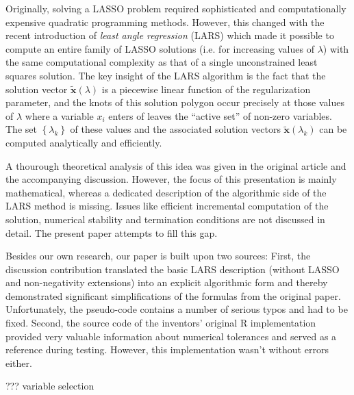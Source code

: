 Originally, solving a LASSO problem required sophisticated and computationally
expensive quadratic programming methods. However, this changed with
the recent introduction of \emph{least angle regression} (LARS) \cite{efron-04-least}
which made it possible to compute an entire family of LASSO solutions
(i.e. for increasing values of $\lambda$) with the same computational
complexity as that of a single unconstrained least squares solution.
The key insight of the LARS algorithm is the fact that the solution
vector $\tilde{\mathbf{x}}\left(\lambda\right)$ is a piecewise linear
function of the regularization parameter, and the knots of this solution
polygon occur precisely at those values of $\lambda$ where a variable
$x_{i}$ enters of leaves the ``active set'' of non-zero variables.
The set $\left\{ \lambda_{k}\right\} $ of these values and the associated
solution vectors $\tilde{\mathbf{x}}\left(\lambda_{k}\right)$ can
be computed analytically and efficiently. 


A thourough theoretical analysis of this idea was given in the original
article \cite{efron-04-least} and the accompanying discussion. However,
the focus of this presentation is mainly mathematical, whereas a dedicated
description of the algorithmic side of the LARS method is missing.
Issues like efficient incremental computation of the solution, numerical
stability and termination conditions are not discussed in detail.
The present paper attempts to fill this gap.


Besides our own research, our paper is built upon two sources: First,
the discussion contribution \cite{turlach-04-discussion} translated
the basic LARS description (without LASSO and non-negativity extensions)
into an explicit algorithmic form and thereby demonstrated significant
simplifications of the formulas from the original paper. Unfortunately,
the pseudo-code contains a number of serious typos and had to be fixed.
Second, the source code of the inventors' original R implementation
provided very valuable information about numerical tolerances and
served as a reference during testing. However, this implementation
wasn't without errors either.


??? variable selection
